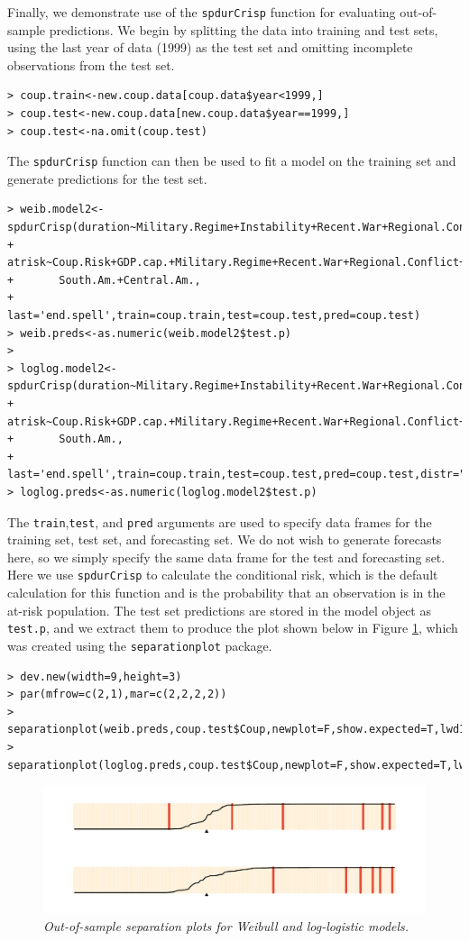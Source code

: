\documentclass[letter]{article}
\begin{document}
Finally, we demonstrate use of the \texttt{spdurCrisp} function for evaluating out-of-sample predictions. We begin by splitting the data into training and test sets, using the last year of data (1999) as the test set and omitting incomplete observations from the test set. 
\small
\begin{verbatim}
> coup.train<-new.coup.data[coup.data$year<1999,]
> coup.test<-new.coup.data[new.coup.data$year==1999,]
> coup.test<-na.omit(coup.test)
\end{verbatim}
\normalsize
The \texttt{spdurCrisp} function can then be used to fit a model on the training set and generate predictions for the test set. 
\small
\begin{verbatim}
> weib.model2<-spdurCrisp(duration~Military.Regime+Instability+Recent.War+Regional.Conflict,
+ 		atrisk~Coup.Risk+GDP.cap.+Military.Regime+Recent.War+Regional.Conflict+
+ 		South.Am.+Central.Am.,
+ 		last='end.spell',train=coup.train,test=coup.test,pred=coup.test)
> weib.preds<-as.numeric(weib.model2$test.p)
>
> loglog.model2<-spdurCrisp(duration~Military.Regime+Instability+Recent.War+Regional.Conflict,
+ 		atrisk~Coup.Risk+GDP.cap.+Military.Regime+Recent.War+Regional.Conflict+
+ 		South.Am.,
+ 		last='end.spell',train=coup.train,test=coup.test,pred=coup.test,distr="loglog")
> loglog.preds<-as.numeric(loglog.model2$test.p)
\end{verbatim}
\normalsize
The \texttt{train},\texttt{test}, and \texttt{pred} arguments are used to specify data frames for the training set, test set, and forecasting set. We do not wish to generate forecasts here, so we simply specify the same data frame for the test and forecasting set. Here we use \texttt{spdurCrisp} to calculate the conditional risk, which is the default calculation for this function and is the probability that an observation is in the at-risk population. The test set predictions are stored in the model object as \texttt{test.p}, and we extract them to produce the plot shown below in Figure \ref{outsamp}, which was created using the \texttt{separationplot} package. 
\small
\begin{verbatim}
> dev.new(width=9,height=3)
> par(mfrow=c(2,1),mar=c(2,2,2,2))
> separationplot(weib.preds,coup.test$Coup,newplot=F,show.expected=T,lwd1=5,lwd2=2)
> separationplot(loglog.preds,coup.test$Coup,newplot=F,show.expected=T,lwd1=5,lwd2=2)
\end{verbatim}
\normalsize
\begin{figure}[htbp!]
\centering
\includegraphics[width=5in]{out-of-sample.pdf}
\caption{{\em Out-of-sample separation plots for Weibull and log-logistic models. }} \label{outsamp}
\end{figure}
\end{document}
